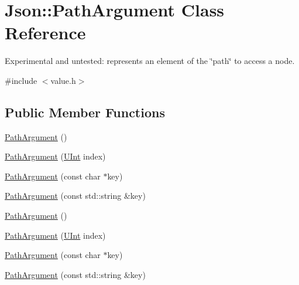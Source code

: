 \hypertarget{classJson_1_1PathArgument}{\section{Json\-:\-:Path\-Argument Class Reference}
\label{dc/d2f/classJson_1_1PathArgument}
}


Experimental and untested\-: represents an element of the \char`\"{}path\char`\"{} to access a node.  




{\ttfamily \#include $<$value.\-h$>$}

\subsection*{Public Member Functions}
\begin{DoxyCompactItemize}
\item 
\hyperlink{classJson_1_1PathArgument_a3c96ed20c56a55eb76d37a11553c528e}{Path\-Argument} ()
\item 
\hyperlink{classJson_1_1PathArgument_aac8f1bee92e1955d4902acccbbc73a70}{Path\-Argument} (\hyperlink{namespaceJson_a800fb90eb6ee8d5d62b600c06f87f7d4}{U\-Int} index)
\item 
\hyperlink{classJson_1_1PathArgument_a9690417a8a40e6e49f2acdf6c9281345}{Path\-Argument} (const char $\ast$key)
\item 
\hyperlink{classJson_1_1PathArgument_a08f872cfee4fc600f7fa3bcaaff0d41c}{Path\-Argument} (const std\-::string \&key)
\item 
\hyperlink{classJson_1_1PathArgument_a3c96ed20c56a55eb76d37a11553c528e}{Path\-Argument} ()
\item 
\hyperlink{classJson_1_1PathArgument_aac8f1bee92e1955d4902acccbbc73a70}{Path\-Argument} (\hyperlink{namespaceJson_a800fb90eb6ee8d5d62b600c06f87f7d4}{U\-Int} index)
\item 
\hyperlink{classJson_1_1PathArgument_a9690417a8a40e6e49f2acdf6c9281345}{Path\-Argument} (const char $\ast$key)
\item 
\hyperlink{classJson_1_1PathArgument_a08f872cfee4fc600f7fa3bcaaff0d41c}{Path\-Argument} (const std\-::string \&key)
\end{DoxyCompactItemize}
